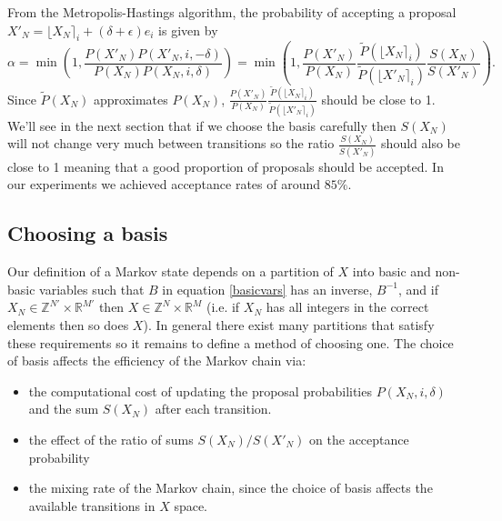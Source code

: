 \documentclass{article}
\begin{document}
From the Metropolis-Hastings algorithm, the probability of accepting a proposal $X'_N = \lfloor X_N \rceil_i + (\delta + \epsilon)e_i$ is given by
\[
\alpha = 
\min\left( 1, \frac{P(X'_N)P(X'_N, i, -\delta)}{P(X_N)P(X_N,i,\delta)} \right) =
\min\left(1, \frac{P(X'_N)}{P(X_N)} \frac{\tilde{P}(\lfloor X_N \rceil_i)}{\tilde{P}(\lfloor X'_N \rceil_i)}  \frac{S(X_N)}{S(X'_N)}\right).
\]
Since $\tilde{P}(X_N)$ approximates $P(X_N)$, $\frac{P(X'_N)}{P(X_N)} \frac{\tilde{P}(\lfloor X_N \rceil_i)}{\tilde{P}(\lfloor X'_N \rceil_i)}$ should be close to 1. We'll see in the next section that if we choose the basis carefully then $S(X_N)$ will not change very much between transitions so the ratio $ \frac{S(X_N)}{S(X'_N)}$ should also be close to 1 meaning that a good proportion of proposals should be accepted. In our experiments we achieved acceptance rates of around $85\%$.

\subsection{Choosing a basis}
\label{basis}
Our definition of a Markov state depends on a partition of $X$ into basic and non-basic variables such that $B$ in equation \eqref{basicvars} has an inverse, $B^{-1}$, and if $X_N \in \mathbb{Z}^{N'} \times \mathbb{R}^{M'}$ then $X \in \mathbb{Z}^{N} \times \mathbb{R}^{M}$ (i.e. if $X_N$ has all integers in the correct elements then so does $X$). In general there exist many partitions that satisfy these requirements so it remains to define a method of choosing one. The choice of basis affects the efficiency of the Markov chain via:
\begin{itemize}
\item the computational cost of updating the proposal probabilities $P(X_N,i,\delta)$ and the sum $S(X_N)$ after each transition.

\item the effect of the ratio of sums $S(X_N)/S(X'_N)$ on the acceptance probability

\item the mixing rate of the Markov chain, since the choice of basis affects the available transitions in $X$ space.
\end{itemize}
\end{document}
